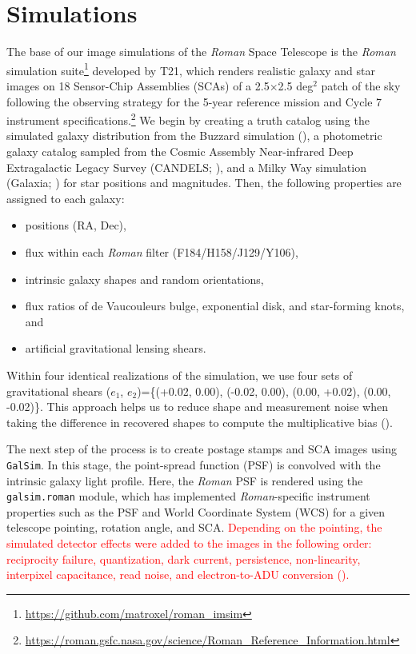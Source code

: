 \documentclass[fleqn,usenatbib]{mnras}
\begin{document}
\section{Simulations}
\label{sec:sims}
The base of our image simulations of the \emph{Roman} Space Telescope is the \emph{Roman} simulation suite\footnote{\url{ https://github.com/matroxel/roman_imsim}} developed by T21, which renders realistic galaxy and star images on 18 Sensor-Chip Assemblies (SCAs) of a 2.5$\times$2.5 \textrm{deg}$^{2}$ patch of the sky following the observing strategy for the 5-year reference mission and Cycle 7 instrument specifications.\footnote{\url{https://roman.gsfc.nasa.gov/science/Roman_Reference_Information.html}} We begin by creating a truth catalog using the simulated galaxy distribution from the Buzzard simulation (\citealt{2019arXiv190102401D}), a photometric galaxy catalog sampled from the Cosmic Assembly Near-infrared Deep Extragalactic Legacy Survey (CANDELS; \citealt{2011ApJS..197...35G, 2011ApJS..197...36K, 2019ApJ...877..117H}), and a Milky Way simulation (Galaxia; \citealt{2011ApJ...730....3S}) for star positions and magnitudes. Then, the following properties are assigned to each galaxy:
\begin{itemize}
    \item positions (RA, Dec),
    \item flux within each \emph{Roman} filter (F184/H158/J129/Y106),
    \item intrinsic galaxy shapes and random orientations,
    \item flux ratios of de Vaucouleurs bulge, exponential disk, and star-forming knots, and
    \item artificial gravitational lensing shears.
\end{itemize} 
Within four identical realizations of the simulation, we use four sets of gravitational shears ($e_{1}$, $e_{2}$)=\{(+0.02, 0.00), (-0.02, 0.00), (0.00, +0.02), (0.00, -0.02)\}. This approach helps us to reduce shape and measurement noise when taking the difference in recovered shapes to compute the multiplicative bias (\citealt{2019A&A...621A...2P}). 


The next step of the process is to create postage stamps and SCA images using \texttt{GalSim}. In this stage, the point-spread function (PSF) is convolved with the intrinsic galaxy light profile. Here, the \emph{Roman} PSF is rendered using the \texttt{galsim.roman} module, which has implemented \emph{Roman}-specific instrument properties such as the PSF and World Coordinate System (WCS) for a given telescope pointing, rotation angle, and SCA. \textcolor{red}{Depending on the pointing, the simulated detector effects were added to the images in the following order: reciprocity failure, quantization, dark current, persistence, non-linearity, interpixel capacitance, read noise, and electron-to-ADU conversion (\citealt{2020JATIS...6d6001M}).}
\end{document}
